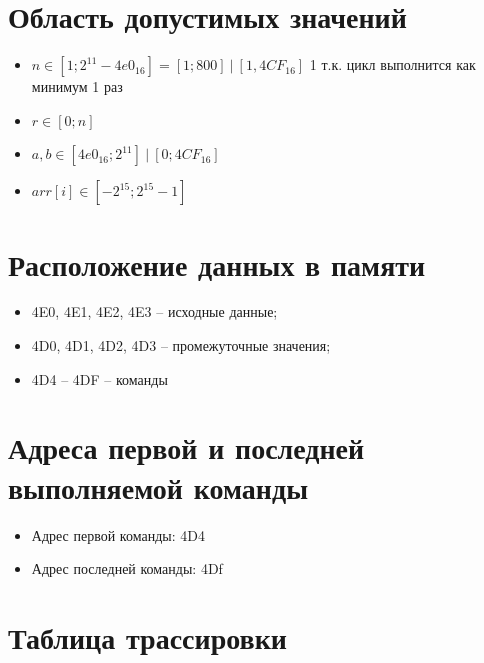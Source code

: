 \documentclass{article}
\begin{document}
\section{Область допустимых значений}

\begin{itemize}
  \item $ n \in [1;  2^{11} - 4e0_{16}] = [1; 800]\ |\ [1, 4CF_{16}]$ 1 т.к. цикл выполнится как минимум 1 раз
  \item $ r \in [0;  n] $
  \item $ a, b \in [4e0_{16};  2^{11}]\ |\ [0;  4CF_{16}] $
  \item $arr[i] \in [-2^{15}; 2^{15}-1]$
\end{itemize}

\section{Расположение данных в памяти}

\begin{itemize}
  \item 4E0, 4E1, 4E2, 4E3 – исходные данные;
  \item  4D0, 4D1, 4D2, 4D3 – промежуточные значения;
  \item  4D4 – 4DF – команды
\end{itemize}

\section{Адреса первой и последней выполняемой команды}

\begin{itemize}
  \item Адрес первой команды: 4D4
  \item Адрес последней команды: 4Df
\end{itemize}
\section{Таблица трассировки}
\end{document}
